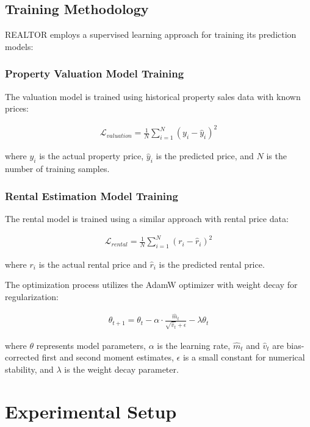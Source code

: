 \documentclass[conference]{IEEEtran}
\begin{document}
\subsection{Training Methodology}
REALTOR employs a supervised learning approach for training its prediction models:

\subsubsection{Property Valuation Model Training}
The valuation model is trained using historical property sales data with known prices:

\begin{align}
\mathcal{L}_{valuation} = \frac{1}{N} \sum_{i=1}^{N} (y_i - \hat{y}_i)^2
\end{align}

where $y_i$ is the actual property price, $\hat{y}_i$ is the predicted price, and $N$ is the number of training samples.

\subsubsection{Rental Estimation Model Training}
The rental model is trained using a similar approach with rental price data:

\begin{align}
\mathcal{L}_{rental} = \frac{1}{N} \sum_{i=1}^{N} (r_i - \hat{r}_i)^2
\end{align}

where $r_i$ is the actual rental price and $\hat{r}_i$ is the predicted rental price.

The optimization process utilizes the AdamW optimizer with weight decay for regularization:

\begin{align}
\theta_{t+1} = \theta_t - \alpha \cdot \frac{\hat{m}_t}{\sqrt{\hat{v}_t} + \epsilon} - \lambda \theta_t
\end{align}

where $\theta$ represents model parameters, $\alpha$ is the learning rate, $\hat{m}_t$ and $\hat{v}_t$ are bias-corrected first and second moment estimates, $\epsilon$ is a small constant for numerical stability, and $\lambda$ is the weight decay parameter.

\section{Experimental Setup}
\end{document}
